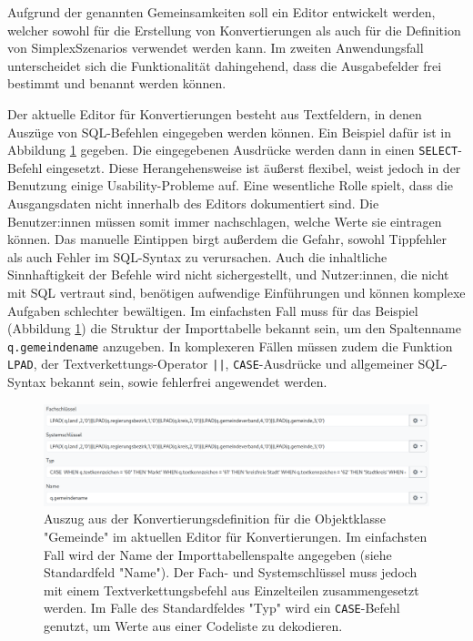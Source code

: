 \pskip
Aufgrund der genannten Gemeinsamkeiten soll ein Editor entwickelt werden, welcher sowohl für die Erstellung von Konvertierungen als auch für die Definition von SimplexSzenarios verwendet werden kann. Im zweiten Anwendungsfall unterscheidet sich die Funktionalität dahingehend, dass die Ausgabefelder frei bestimmt und benannt werden können.

\pskip
Der aktuelle Editor für Konvertierungen besteht aus Textfeldern, in denen Auszüge von \ac{SQL}-Befehlen eingegeben werden können. Ein Beispiel dafür ist in Abbildung \ref{fig:conversion-gemeinde} gegeben. Die eingegebenen Ausdrücke werden dann in einen \texttt{SELECT}-Befehl eingesetzt. Diese Herangehensweise ist äußerst flexibel, weist jedoch in der Benutzung einige Usability-Probleme auf. Eine wesentliche Rolle spielt, dass die Ausgangsdaten nicht innerhalb des Editors dokumentiert sind. Die Benutzer:innen müssen somit immer nachschlagen, welche Werte sie eintragen können. Das manuelle Eintippen birgt außerdem die Gefahr, sowohl Tippfehler als auch Fehler im \ac{SQL}-Syntax zu verursachen. Auch die inhaltliche Sinnhaftigkeit der Befehle wird nicht sichergestellt, und Nutzer:innen, die nicht mit SQL vertraut sind, benötigen aufwendige Einführungen und können komplexe Aufgaben schlechter bewältigen. Im einfachsten Fall muss für das Beispiel (Abbildung \ref{fig:conversion-gemeinde}) die Struktur der Importtabelle bekannt sein, um den Spaltenname \texttt{q.gemeindename} anzugeben. In komplexeren Fällen müssen zudem die Funktion \texttt{LPAD}, der Textverkettungs-Operator \texttt{||}, \texttt{CASE}-Ausdrücke und allgemeiner \ac{SQL}-Syntax bekannt sein, sowie fehlerfrei angewendet werden.

\begin{figure}[ht]
  \centering
  \includegraphics[width=.95\textwidth]{assets/conversion-gemeinde.png}
  \caption[Auszug einer Konvertierungsdefinition im aktuellen Editor]{Auszug aus der Konvertierungsdefinition für die Objektklasse "Gemeinde" im aktuellen Editor für Konvertierungen. Im einfachsten Fall wird der Name der Importtabellenspalte angegeben (siehe Standardfeld "Name"). Der Fach- und Systemschlüssel muss jedoch mit einem Textverkettungsbefehl aus Einzelteilen zusammengesetzt werden. Im Falle des Standardfeldes "Typ" wird ein \texttt{CASE}-Befehl genutzt, um Werte aus einer Codeliste zu dekodieren.}
  \label{fig:conversion-gemeinde}
\end{figure}

